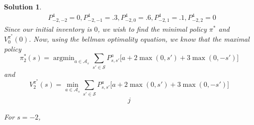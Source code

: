 \documentclass[12pt]{amsart}
\newtheorem{sol}[thm]{Solution}
\newcommand{\MA}{\mathcal{A}}
\newcommand{\MS}{\mathcal{S}}
\DeclareMathOperator*{\argmin}{argmin}
\begin{document}
\begin{sol}
\begin{align*}
&P^4_{-2,-2} = 0, P^4_{-2,-1} = .3, P^4_{-2,0} = .6, P^4_{-2,1} = .1, P^4_{-2,2} = 0 
\end{align*}
Since our initial inventory is $0$, we wish to find the minimal policy $\pi^*$ and $V^{\pi^*}_0(0)$. Now, using the bellman optimality equation, we know that the maximal policy $$\pi^*_2(s) = \argmin_{a \in \MA_s} \sum_{s' \in \MS} P^a_{s,s'} \bigg[ a + 2\max(0, s')+3\max(0,-s')\bigg]$$ and $$ V^{\pi^*}_{2}(s) = \min_{a \in \MA_s} \sum_{s' \in \MS} P^a_{s,s'} \bigg[ a + 2\max(0, s')+3\max(0,-s')\bigg]$$
\begin{align*}
j
\end{align*}

For $s = -2$, 
\end{sol}
\end{document}
